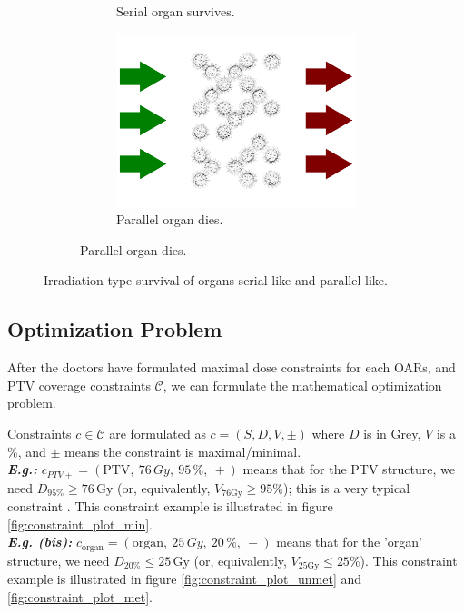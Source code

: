 \begin{figure}
\begin{subfigure}[b]{0.48\textwidth}
\begin{subfigure}[b]{0.55\textwidth}
			\vspace{0.5mm}
			\caption{Serial organ survives.}
		\end{subfigure}
		\vbar
		\begin{subfigure}[b]{0.35\textwidth}
			\addtocounter{subfigure}{-1}
			\renewcommand\thesubfigure{\alph{subfigure}2}
			\centering
			\includegraphics[width=\textwidth]{parallel_heat_square_post.pdf}
			\caption{Parallel organ dies.}
		\end{subfigure}	
	\end{subfigure}
	\addtocounter{subfigure}{-1}
	\caption{Irradiation type survival of organs serial-like and parallel-like.}
	\label{fig:serial_parallel_organ_radiation}
\end{figure}

\subsection{Optimization Problem}
After the doctors have formulated maximal dose constraints for each OARs, and PTV coverage constraints $\mathcal{C}$, we can formulate the mathematical optimization problem.

Constraints $c \in \mathcal{C}$ are formulated as $c = \left( S, D, V, \pm \right)$ where $D$ is in Grey, $V$ is a \%, and $\pm$ means the constraint is maximal/minimal.
\\
\textit{\textbf{E.g.:}} $c_{PTV+} = \left( \text{PTV}, \ 76\,Gy, \ 95\,\%, \ + \right)$ means that for the PTV structure, we need $D_{95\%} \geq 76\,\text{Gy}$ (or, equivalently, $V_{76\text{Gy}} \geq 95 \%$); this is a very typical constraint \cite{Zhao2016}.
This constraint example is illustrated in figure \ref{fig:constraint_plot_min}.
\\
\textit{\textbf{E.g. (bis):}} $c_{\text{organ}} = \left( \text{organ}, \ 25\, Gy, \ 20\,\%, \ - \right)$ means that for the 'organ' structure, we need $D_{20\%} \leq 25\,\text{Gy}$ (or, equivalently, $V_{25\text{Gy}} \leq 25 \%$).
This constraint example is illustrated in figure \ref{fig:constraint_plot_unmet} and \ref{fig:constraint_plot_met}.

